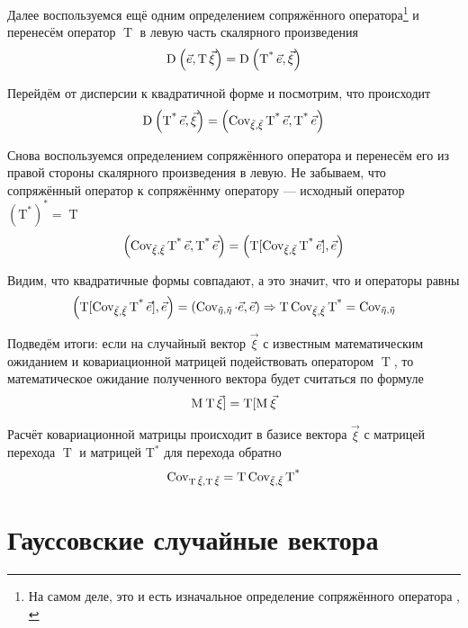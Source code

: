 Далее воспользуемся ещё одним определением сопряжённого оператора\footnote{На
самом деле, это и есть изначальное определение сопряжённого оператора
\cite[с.~241]{VoevodinLA}, \cite[с.~126]{IlinPoznyarLA}}
и перенесём оператор $\operatorname{T}$ в левую часть скалярного произведения
$$\operatorname{D}_{} \left( \vec{e}, \operatorname{T} \vec{\xi} \right)
    = \operatorname{D}_{} \left( \operatorname{T^*} \vec{e} , \vec{\xi} \right)$$

Перейдём от дисперсии к квадратичной форме и посмотрим, что происходит
$$\operatorname{D}_{} \left( \operatorname{T^*} \vec{e} , \vec{\xi} \right)
    = \left( \operatorname{\operatorname{Cov_{\vec{\xi}, \vec{\xi}}}} \operatorname{T^*} \vec{e} ,
        \operatorname{T^*} \vec{e} \right)$$

Снова воспользуемся определением сопряжённого оператора и перенесём его
из правой стороны скалярного произведения в левую. Не забываем, что
сопряжённый оператор к сопряжённму оператору --- исходный оператор
$\left( \operatorname{T^*} \right)^* = \operatorname{T}$
$$\left( \operatorname{\operatorname{Cov_{\vec{\xi}, \vec{\xi}}}} \operatorname{T^*} \vec{e} ,
        \operatorname{T^*} \vec{e} \right)
    = \left( \operatorname{T}[
            \operatorname{\operatorname{Cov_{\vec{\xi}, \vec{\xi}}}} \operatorname{T^*} \vec{e}] ,
        \vec{e} \right)$$

Видим, что квадратичные формы совпадают, а это значит, что и операторы равны
$$\left( \operatorname{T}[
    \operatorname{\operatorname{Cov_{\vec{\xi}, \vec{\xi}}}} \operatorname{T^*} \vec{e}] , \vec{e} \right)
        = \left( \operatorname{Cov_{\vec{\eta}, \vec{\eta}}} \cdot \vec{e}, \vec{e} \right)
    \Rightarrow
    \operatorname{T} \operatorname{\operatorname{Cov_{\vec{\xi}, \vec{\xi}}}} \operatorname{T^*} 
        = \operatorname{Cov_{\vec{\eta}, \vec{\eta}}}$$

Подведём итоги: если на случайный вектор $\vec{\xi}$ с известным математическим
ожиданием и ковариационной матрицей подействовать оператором $\operatorname{T}$,
то математическое ожидание полученного вектора будет считаться по формуле
$$\operatorname{M}_{} \operatorname{T} \vec{\xi}] = \operatorname{T}[\operatorname{M}_{} \vec{\xi} $$

Расчёт ковариационной матрицы происходит в базисе вектора $\vec{\xi}$
с матрицей перехода $\operatorname{T}$ и матрицей $\operatorname{T^*}$
для перехода обратно
$$\operatorname{Cov_{\operatorname{T} \vec{\xi} , \operatorname{T} \vec{\xi} }}
    = \operatorname{T} \operatorname{\operatorname{Cov_{\vec{\xi}, \vec{\xi}}}} \operatorname{T^*} $$

\section{Гауссовские случайные вектора}

